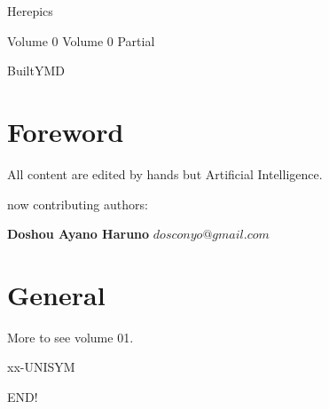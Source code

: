 \begin{sloppypar}
\author{dosconio}
\begin{center}
	\sc\fontsize{48pt}{0}\selectfont\textcolor[rgb]{1, 0, 0.618}{Herepics}
\end{center}
\ifdetail
{\hfill\sc\fontsize{24pt}{0}\selectfont\textcolor[rgb]{1, 0, 0.618}{Volume 0}}
\else
{\hfill\sc\fontsize{24pt}{0}\selectfont\textcolor[rgb]{1, 0, 0.618}{Volume 0} Partial}
\fi

{\hfill\sc\fontsize{24pt}{0}\selectfont\textcolor[rgb]{1, 0, 0.618}{BuiltY\number\year M\number\month D\number\day}}

\newpage %
\renewcommand{\contentsname}{Contents}
\tableofcontents

\section{Foreword} %

All content\cite{HEREPIC} are edited by hands but Artificial Intelligence.

now contributing authors:

\textbf{Doshou Ayano Haruno}
$dosconyo@gmail.com$

\section{General}


	

	More to see volume 01.

	

	

	

	

	

	

	

	

	

	

	

	{xx-UNISYM}

	

	

\newpage

\nocite{*}

END!
\end{sloppypar}